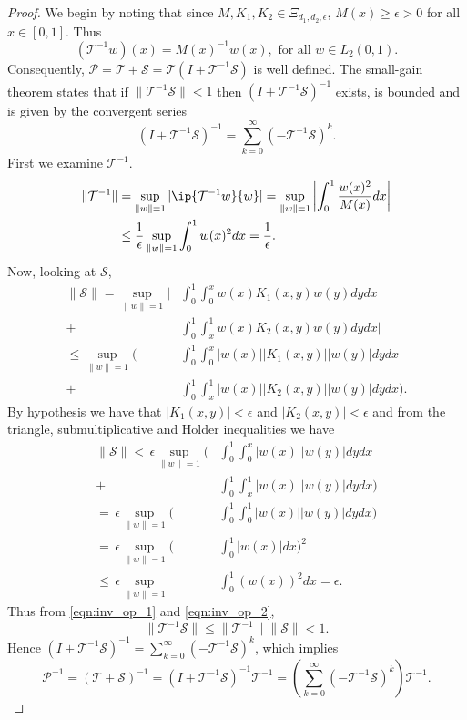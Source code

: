 \documentclass[9pt,journal,twocolumn]{IEEEtran}
\newcommand{\igzo}{\int_0^1}
\newcommand{\igzx}{\int_0^x}
\newcommand{\igxo}{\int_x^1}
\newcommand{\lt}{L_2(0,1)}
\begin{document}
\begin{proof}
We begin by noting that since $M,K_1,K_2 \in  \Xi_{d_1,d_2,\epsilon}$, $M(x) \geq \epsilon >0$ for all $x \in [0,1]$. Thus
\[
(\mathcal{T}^{-1}w)(x)=M(x)^{-1}w(x), \text{ for all }w \in \lt.
\]
Consequently,
$\mathcal{P}=\mathcal{T}+\mathcal{S}=\mathcal{T}(I+\mathcal{T}^{-1}\mathcal{S})$ is well defined. The small-gain theorem states that  if $\|\mathcal{T}^{-1}\mathcal{S}\| <1 $ then $(I+\mathcal{T}^{-1}\mathcal{S})^{-1}$ exists, is bounded and is given by the convergent series
\[
(I+\mathcal{T}^{-1}\mathcal{S})^{-1}= \sum_{k=0}^\infty(-\mathcal{T}^{-1}\mathcal{S})^k.
\]
First we examine $\mathcal{T}^{-1}$.
\begin{align}
\|\mathcal{T}^{-1}\|&=\sup_{\|w\|=1}|\ip{\mathcal{T}^{-1}w}{w}|=\sup_{\|w\|=1} \left|\igzo \frac{w(x)^2}{M(x)}dx \right| \nonumber \\
&\label{eqn:inv_op_1}\leq \frac{1}{\epsilon} \sup_{\|w\|=1} \igzo w(x)^2 dx = \frac{1}{\epsilon}.
\end{align}
Now, looking at $\mathcal{S}$,
\begin{align*}
\|\mathcal{S}\|= \sup_{\|w\|=1} \bigg| &\igzo \igzx w(x)K_1(x,y)w(y) dy dx   \\
  + &\igzo \igxo w(x)K_2(x,y)w(y) dy dx  \bigg| \\
\leq  \sup_{\|w\|=1} \bigg( &\igzo \igzx |w(x)||K_1(x,y)||w(y)| dy dx   \\
 + &\igzo \igxo |w(x)||K_2(x,y)||w(y)| dy dx  \bigg) .
\end{align*}
By hypothesis we have that $|K_1(x,y)| < \epsilon$ and $|K_2(x,y)| < \epsilon$ and from the triangle, submultiplicative and Holder inequalities we have
\begin{align}
\|\mathcal{S}\| <\,  \epsilon \sup_{\|w\|=1}  \bigg( &\igzo \igzx |w(x)||w(y)| dy dx  \nonumber \\
  + &\igzo \igxo |w(x)||w(y)| dy dx \bigg) \nonumber \\
= \, \epsilon \sup_{\|w\|=1}  \bigg( &\igzo \igzo |w(x)||w(y)| dy dx  \bigg) \nonumber \\
= \, \epsilon \sup_{\|w\|=1}  \bigg( &\igzo |w(x)| dx  \bigg)^2 \nonumber \\
\leq \, \epsilon \sup_{\|w\|=1} \quad &\label{eqn:inv_op_2} \igzo (w(x))^2 dx = \epsilon.
\end{align} Thus from \eqref{eqn:inv_op_1} and \eqref{eqn:inv_op_2},
\[\|\mathcal{T}^{-1}\mathcal{S}\| \leq \|\mathcal{T}^{-1}\|\|\mathcal{S}\|<1.\] Hence $(I+\mathcal{T}^{-1}\mathcal{S})^{-1}= \sum_{k=0}^\infty(-\mathcal{T}^{-1}\mathcal{S})^k$, which implies
\[\mathcal{P}^{-1}=(\mathcal{T}+\mathcal{S})^{-1}=(I+\mathcal{T}^{-1}\mathcal{S})^{-1} \mathcal{T}^{-1}= \left( \sum_{k=0}^\infty(-\mathcal{T}^{-1}\mathcal{S})^k \right) \mathcal{T}^{-1}.\]
\end{proof}
\end{document}
